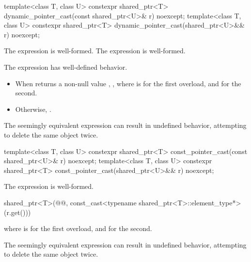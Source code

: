 %
\begin{itemdecl}
template<class T, class U>
  constexpr shared_ptr<T> dynamic_pointer_cast(const shared_ptr<U>& r) noexcept;
template<class T, class U>
  constexpr shared_ptr<T> dynamic_pointer_cast(shared_ptr<U>&& r) noexcept;
\end{itemdecl}

\begin{itemdescr}
\pnum
\mandates
The expression  is well-formed.
The expression  is well-formed.

\pnum
\expects
The expression  has well-defined behavior.

\pnum
\returns
\begin{itemize}
\item When 
  returns a non-null value ,
  ,
  where  is  for the first overload, and
   for the second.
\item Otherwise, .
\end{itemize}

\pnum
\begin{note}
The seemingly equivalent expression
 can result in
undefined behavior, attempting to delete the same object twice.
\end{note}
\end{itemdescr}

%
\begin{itemdecl}
template<class T, class U>
  constexpr shared_ptr<T> const_pointer_cast(const shared_ptr<U>& r) noexcept;
template<class T, class U>
  constexpr shared_ptr<T> const_pointer_cast(shared_ptr<U>&& r) noexcept;
\end{itemdecl}

\begin{itemdescr}
\pnum
\mandates
The expression  is well-formed.

\pnum
\returns
\begin{codeblock}
shared_ptr<T>(@@, const_cast<typename shared_ptr<T>::element_type*>(r.get()))
\end{codeblock}
where  is  for the first overload, and
 for the second.

\pnum
\begin{note}
The seemingly equivalent expression
 can result in
undefined behavior, attempting to delete the same object twice.
\end{note}
\end{itemdescr}


